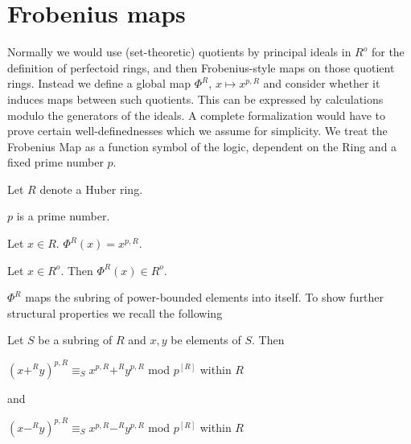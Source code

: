 \documentclass[11pt]{article}
\begin{document}
\section{Frobenius maps}
Normally we would use (set-theoretic) quotients by principal ideals in $R^o$
for the definition of perfectoid rings, and then Frobenius-style maps on
those quotient rings.
Instead we define a global map $\Phi^R$, $x \mapsto x^{p,R}$ and consider
whether it induces maps between such quotients. This
can be expressed by calculations modulo the generators of the ideals. 
A complete formalization would have to prove certain well-definednesses
which we assume for simplicity.
We treat the Frobenius Map as a function symbol of the logic, dependent
on the Ring and a fixed prime number $p$.

\begin{forthel}

Let $R$ denote a Huber ring.

\begin{signature} $p$ is a prime number. 
\end{signature}

\begin{definition}
Let $x \in R$. $\Phi^{R} (x) = x^{p,R}$. 
\end{definition}

\begin{lemma}
Let $x \in R^o$. Then $\Phi^{R}(x) \in R^o$.
\end{lemma}

\end{forthel}

$\Phi^{R}$ maps the subring of power-bounded elements into itself.
To show further structural properties we recall the following

\begin{lemma*}
Let $S$ be a subring of $R$ and $x,y$ be elements of $S$.
Then 

$(x +^{R} y)^{p,R} \equiv_{S} 
x^{p,R} +^{R} y^{p,R}$ mod $p^{[R]}$ within $R$ 

and

$(x -^{R} y)^{p,R} \equiv_{S} 
x^{p,R} -^{R} y^{p,R}$ mod $p^{[R]}$ within $R$ 
\end{lemma*}
\end{document}
